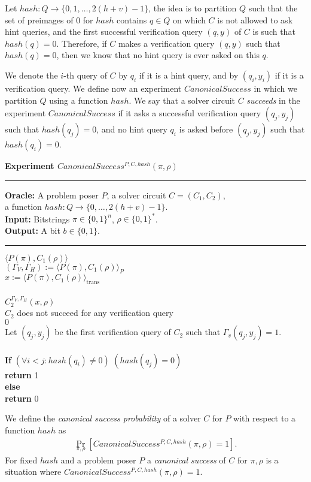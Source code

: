%

Let $hash:Q\rightarrow\{0,1,\dots, 2(h+v)-1\}$,
the idea is to partition $Q$ such that the set of preimages of $0$ for $hash$ contains $q \in Q$ on which $C$ is not allowed to ask hint queries,
and the first successful verification query $(q,y)$ of $C$ is such that $hash(q) = 0$.
Therefore, if $C$ makes a verification query $(q,y)$ such that $hash(q) = 0$, then we know that no hint query is ever asked on this $q$.

We denote the $i$-th query of $C$ by $q_i$ if it is a hint query, and by $(q_i, y_i)$ if it is a verification query.
We define now an experiment $CanonicalSuccess$ in which we partition $Q$ using a function $hash$.
We say that a solver circuit $C$ \textit{succeeds} in the experiment $CanonicalSuccess$
if it asks a successful verification query $(q_j, y_j)$ such that $hash(q_j) = 0$,
and no hint query $q_i$ is asked before $(q_j, y_j)$ such that $hash(q_i) = 0$.
%
\begin{codeblock}
  \textbf{Experiment $CanonicalSuccess^{P, C, hash}(\pi, \rho)$}
  \medskip
  \hrule
  \medskip
  \textbf{Oracle:} A problem poser $P$, a solver circuit $C = (C_1, C_2)$,\\
  \IndII a function $hash: Q \rightarrow \{0, \dots, 2(h+v) - 1\}$.\\
  \textbf{Input:}  Bitstrings $\pi \in \{0,1\}^n$, $\rho \in \{0,1\}^*$. \\
  \textbf{Output:} A bit $b \in \{0,1\}$.

  \medskip\hrule\medskip
  \Run $\langle P(\pi), C_1(\rho) \rangle$ \\
  \IndI $(\Gamma_V, \Gamma_H) := \langle P(\pi), C_1(\rho) \rangle_{P}$ \\
  \IndI $x := \langle P(\pi), C_1(\rho) \rangle_{\text{trans}}$ \\ \\
  \Run $C_2^{\Gamma_V, \Gamma_H} (x, \rho)$ \\
  \IndI \If $C_2$ does not succeed for any verification query \Then \\
  \IndII \Return $0$ \\
  \IndI Let $(q_j,y_j)$ be the first verification query of $C_2$ such that $\Gamma_v(q_j, y_j) = 1$.\\
  \\
  \textbf{If} $(\forall i < j :  hash(q_i) \neq 0)$ \And $(hash(q_j) = 0)$ \Then \\
  \IndI \textbf{return} 1\\
  \textbf{else}\\
  \IndI \textbf{return} 0
\end{codeblock}
%
We define the \textit{canonical success probability} of a solver $C$ for $P$ with respect to a function $hash$ as
\begin{align}
 \underset{\pi, \rho}{\Pr}[CanonicalSuccess^{P, C, hash}(\pi, \rho) = 1].
\end{align}
%
For fixed $hash$ and a problem poser $P$ a \textit{canonical success} of $C$ for $\pi, \rho$ is a situation where $CanonicalSuccess^{P, C, hash}(\pi, \rho) = 1$.

